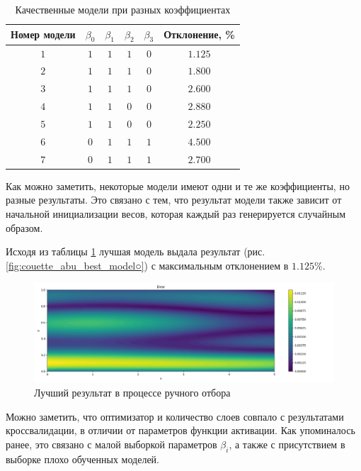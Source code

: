 \begin{table}[ht]
    \centering
    \caption{Качественные модели при разных коэффициентах}
    \begin{tabular}{ |c|c|c|c|c|c| } 
        \hline
        Номер модели & $\beta_0$ & $\beta_1$ & $\beta_2$ & $\beta_3$ & Отклонение, \% \\
        \hline
        $1$ & $1$ & $1$ & $1$ & $0$ & $1.125$ \\ 
        \hline
        $2$ & $1$ & $1$ & $1$ & $0$ & $1.800$ \\ 
        \hline
        $3$ & $1$ & $1$ & $1$ & $0$ & $2.600$ \\ 
        \hline
        $4$ & $1$ & $1$ & $0$ & $0$ & $2.880$ \\ 
        \hline
        $5$ & $1$ & $1$ & $0$ & $0$ & $2.250$ \\ 
        \hline
        $6$ & $0$ & $1$ & $1$ & $1$ & $4.500$ \\ 
        \hline
        $7$ & $0$ & $1$ & $1$ & $1$ & $2.700$ \\ 
        \hline
    \end{tabular}
    \label{table:couette_abu_best_models}
\end{table}

Как можно заметить, некоторые модели имеют одни и те же коэффициенты, но
разные результаты. Это связано с тем, что результат модели также 
зависит от начальной инициализации весов, которая каждый раз
генерируется случайным образом.

Исходя из таблицы \ref{table:couette_abu_best_models} лучшая модель
выдала результат (рис. \ref{fig:couette_abu_best_model○}) с максимальным отклонением в $1.125\%$.

\begin{figure}[ht]
    \includegraphics{data/couette_abu_error_best_model.png}
    \caption{Лучший результат в процессе ручного отбора}
    \label{fig:couette_abu_best_model}
\end{figure}

Можно заметить, что оптимизатор и количество слоев совпало
с результатами кроссвалидации, в отличии от параметров
функции активации. Как упоминалось ранее, это связано с
малой выборкой параметров $\beta_i$, а также с присутствием
в выборке плохо обученных моделей. 

